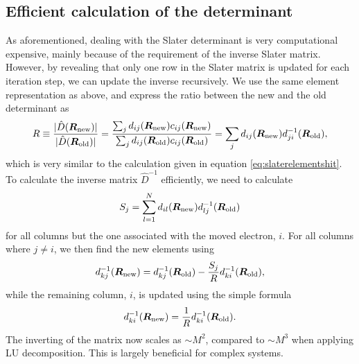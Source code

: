 \subsection{Efficient calculation of the determinant} \label{sec:efficientcalculationsofslaterdeterminant}
As aforementioned, dealing with the Slater determinant is very computational expensive, mainly because of the requirement of the inverse Slater matrix. However, by revealing that only one row in the Slater matrix is updated for each iteration step, we can update the inverse recursively. We use the same element representation as above, and express the ratio between the new and the old determinant as
\begin{equation}
R\equiv \frac{|\hat{D}(\boldsymbol{{R}}_{\text{new}})|}{|\hat{D}(\boldsymbol{{R}}_{\text{old}})|}=\frac{\sum_{j}d_{ij}(\boldsymbol{{R}}_{\text{new}})c_{ij}(\boldsymbol{{R}}_{\text{new}})}{\sum_{j}d_{ij}(\boldsymbol{{R}}_{\text{old}})c_{ij}(\boldsymbol{{R}}_{\text{old}})}=\sum_{j}d_{ij}(\boldsymbol{{R}}_{\text{new}})d_{ji}^{-1}(\boldsymbol{{R}}_{\text{old}}),
\label{eq:slaterratio}
\end{equation}
which is very similar to the calculation given in equation \eqref{eq:slaterelementshit}. To calculate the inverse matrix $\hat{D}^{-1}$ efficiently, we need to calculate
\begin{equation}
S_j=\sum_{l=1}^Nd_{il}(\boldsymbol{{R}}_{\text{new}})d_{lj}^{-1}(\boldsymbol{{R}}_{\text{old}})
\label{eq:slaters}
\end{equation}
for all columns but the one associated with the moved electron, $i$. For all columns where $j\neq i$, we then find the new elements using
\begin{equation}
d_{kj}^{-1}(\boldsymbol{{R}}_{\text{new}})=d_{kj}^{-1}(\boldsymbol{{R}}_{\text{old}})-\frac{S_j}{R}d_{ki}^{-1}(\boldsymbol{{R}}_{\text{old}}),
\label{eq:slaterinverse}
\end{equation}
while the remaining column, $i$, is updated using the simple formula \supercite{morten_hjorth-jensen_computational_2019}
\begin{equation}
d_{ki}^{-1}(\boldsymbol{{R}}_{\text{new}})=\frac{1}{R}d_{ki}^{-1}(\boldsymbol{{R}}_{\text{old}}).
\label{eq:slaterinverse2}
\end{equation}
The inverting of the matrix now scales as $\sim M^2$, compared to $\sim M^3$ when applying LU decomposition. This is largely beneficial for complex systems.

